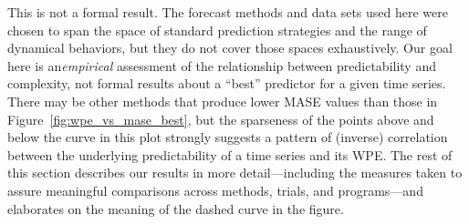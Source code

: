 This is not a formal result.  The forecast methods and data sets used
here were chosen to span the space of standard prediction strategies
and the range of dynamical behaviors, but they do not cover those
spaces exhaustively.  Our goal here is an\emph{empirical} assessment
of the relationship between predictability and complexity, not formal
results about a ``best'' predictor for a given time series.  There may
be other methods that produce lower MASE values than those in
Figure~\ref{fig:wpe_vs_mase_best}, but the sparseness of the points
above and below the curve in this plot strongly suggests a pattern of
(inverse) correlation between the underlying predictability of a time
series and its WPE.  The rest of this section describes our results in
more detail---including the measures taken to assure meaningful
comparisons across methods, trials, and programs---and elaborates on
the meaning of the dashed curve in the figure.

